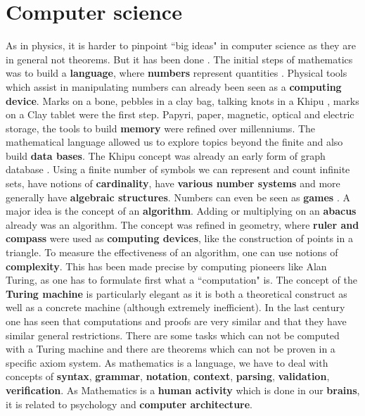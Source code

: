 \documentclass[12pt]{amsart}
\begin{document}
\section*{Computer science} 

As in physics, it is harder to pinpoint ``big ideas" in computer science as they are in general not 
theorems. But it has been done \cite{KnuthComputerProgramming}.
The initial steps of mathematics was to build a {\bf language}, where {\bf numbers}
represent quantities \cite{conway_guy}. Physical tools which assist in manipulating numbers can
already been seen as a {\bf computing device}. Marks on a bone, pebbles in a clay bag, talking knots in a
Khipu \cite{UrtonInkaHistoryKnots,AscherAscher}, marks on a Clay tablet were the first step. 
Papyri, paper, magnetic, optical and electric
storage, the tools to build {\bf memory} were refined over millenniums. The mathematical language
allowed us to explore topics beyond the finite and also build {\bf data bases}. The Khipu concept was
already an early form of graph database \cite{AggarwalWangGraphData}.
Using a finite number of symbols we can represent and count
infinite sets, have notions of {\bf cardinality}, have {\bf various number systems} and more generally
have {\bf algebraic structures}. Numbers can even be seen as {\bf games} \cite{numbersgames,knuthnumbers}.
A major idea is the concept of an {\bf algorithm}. Adding or multiplying on an {\bf abacus} already
was an algorithm. The concept was refined in geometry, where {\bf ruler and compass} were used as
{\bf computing devices}, like the construction of points in a triangle. 
To measure the effectiveness of an algorithm, one can use notions of {\bf complexity}. 
This has been made precise by computing pioneers like Alan Turing,
as one has to formulate first what a ``computation" is. The concept of the {\bf Turing machine} is 
particularly elegant as it is both a theoretical construct as well as a concrete machine (although 
extremely inefficient). 
In the last century one has seen that computations and
proofs are very similar and that they have similar general restrictions. There are
some tasks which can not be computed with a Turing machine and there are theorems
which can not be proven in a specific axiom system. 
As mathematics is a language, we have to deal with concepts of {\bf syntax}, {\bf grammar}, 
{\bf notation}, {\bf context}, {\bf parsing}, {\bf validation}, {\bf verification}. 
As Mathematics is a {\bf human activity} which is done in our {\bf brains}, it is related to 
psychology and {\bf computer architecture}. 
\end{document}
